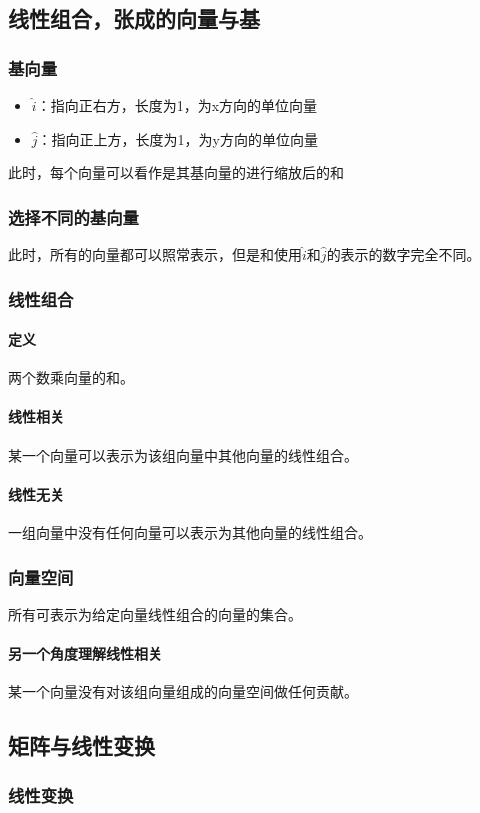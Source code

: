 \documentclass[UTF8]{ctexart}
\begin{document}
\subsection{线性组合，张成的向量与基}
\subsubsection{基向量}
\begin{itemize}
	\item $\hat{i}$：指向正右方，长度为1，为x方向的单位向量
	\item $\hat{j}$：指向正上方，长度为1，为y方向的单位向量
\end{itemize}
此时，每个向量可以看作是其基向量的进行缩放后的和
\subsubsection{选择不同的基向量}
此时，所有的向量都可以照常表示，但是和使用$\hat{i}$和$\hat{j}$的表示的数字完全不同。
\subsubsection{线性组合}
\paragraph{定义}
两个数乘向量的和。
\paragraph{线性相关}
某一个向量可以表示为该组向量中其他向量的线性组合。
\paragraph{线性无关}
一组向量中没有任何向量可以表示为其他向量的线性组合。
\subsubsection{向量空间}
所有可表示为给定向量线性组合的向量的集合。
\paragraph{另一个角度理解线性相关}
某一个向量没有对该组向量组成的向量空间做任何贡献。

\subsection{矩阵与线性变换}
\subsubsection{线性变换}
\end{document}
